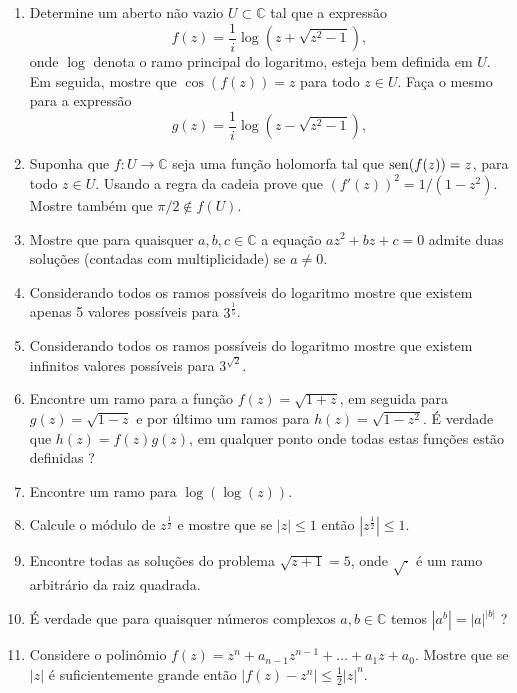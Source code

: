 \begin{enumerate}[leftmargin=*]
	\item Determine um aberto não vazio $U\subset \mathbb{C}$ tal que a expressão 
	      $$
	      f(z)=\frac{1}{i}\log(z+\sqrt{z^2-1}),
	      $$
	      onde $\log$ denota o ramo principal do logaritmo, esteja bem definida em $U$. Em seguida, 
	      mostre que $\cos(f(z))=z$ para todo $z\in U$. Faça o mesmo para a expressão 
	      $$
	      g(z)=\frac{1}{i}\log(z-\sqrt{z^2-1}),
	      $$

	\item Suponha que $f:U\to\mathbb{C}$ seja uma função holomorfa tal que $\operatorname{sen}(f(z))=z$, para 
	todo $z\in U$. Usando a regra da cadeia prove que $(f'(z))^2=1/(1-z^2)$. Mostre também que $\pi/2\notin f(U)$.

	\item Mostre que para quaisquer $a,b,c\in\mathbb{C}$ a equação $az^2+bz+c=0$ admite duas soluções (contadas com multiplicidade) 
	se $a\neq 0$.

	\item Considerando todos os ramos possíveis do logaritmo mostre que existem apenas 5 valores possíveis para $3^{\frac{1}{5}}$.  

	\item Considerando todos os ramos possíveis do logaritmo mostre que existem infinitos valores possíveis para $3^{\sqrt{2}}$.

	\item Encontre um ramo para a função $f(z)=\sqrt{1+z}$, em seguida para $g(z)=\sqrt{1-z}$ e por último
	um ramos para $h(z)=\sqrt{1-z^2}$. É verdade que $h(z)=f(z)g(z)$, em qualquer ponto onde todas estas funções estão definidas ?

	\item Encontre um ramo para $\log(\log(z))$.

	\item Calcule o módulo de $z^{\frac{1}{2}}$ e mostre que se $|z|\leq 1$ então $|z^{\frac{1}{2}}|\leq 1$.

	\item Encontre todas as soluções do problema $\sqrt{z+1}=5$, onde $\sqrt{\cdot}$ é um ramo arbitrário da raiz quadrada.

	\item É verdade que para quaisquer números complexos $a,b\in \mathbb{C}$ temos $|a^b|=|a|^{|b|}$ ? 

	\item Considere o polinômio $f(z)=z^n+a_{n-1}z^{n-1}+\ldots+a_1z+a_0$. Mostre que se $|z|$ é suficientemente grande então 
	$|f(z)-z^n|\leq \frac{1}{2}|z|^n$.


\end{enumerate}
